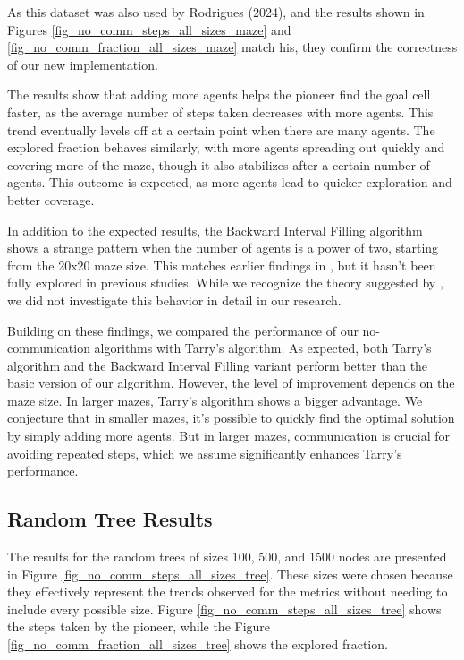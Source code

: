As this dataset was also used by Rodrigues (2024), and the results shown in Figures \ref{fig_no_comm_steps_all_sizes_maze} and \ref{fig_no_comm_fraction_all_sizes_maze} match his, they confirm the correctness of our new implementation.

The results show that adding more agents helps the pioneer find the goal cell faster, as the average number of steps taken decreases with more agents. This trend eventually levels off at a certain point when there are many agents. The explored fraction behaves similarly, with more agents spreading out quickly and covering more of the maze, though it also stabilizes after a certain number of agents. This outcome is expected, as more agents lead to quicker exploration and better coverage.

In addition to the expected results, the Backward Interval Filling algorithm shows a strange pattern when the number of agents is a power of two, starting from the 20x20 maze size. This matches earlier findings in \cite{Arthur2023}, but it hasn't been fully explored in previous studies. While we recognize the theory suggested by , we did not investigate this behavior in detail in our research.

Building on these findings, we compared the performance of our no-communication algorithms with Tarry's algorithm. As expected, both Tarry's algorithm and the Backward Interval Filling variant perform better than the basic version of our algorithm. However, the level of improvement depends on the maze size. In larger mazes, Tarry's algorithm shows a bigger advantage. We conjecture that in smaller mazes, it's possible to quickly find the optimal solution by simply adding more agents. But in larger mazes, communication is crucial for avoiding repeated steps, which we assume significantly enhances Tarry's performance.

\subsection{Random Tree Results} 
\label{subsection_no_comm_random_tree_results}

The results for the random trees of sizes 100, 500, and 1500 nodes are presented in Figure \ref{fig_no_comm_steps_all_sizes_tree}. These sizes were chosen because they effectively represent the trends observed for the metrics without needing to include every possible size. Figure \ref{fig_no_comm_steps_all_sizes_tree} shows the steps taken by the pioneer, while the Figure \ref{fig_no_comm_fraction_all_sizes_tree} shows the explored fraction.


